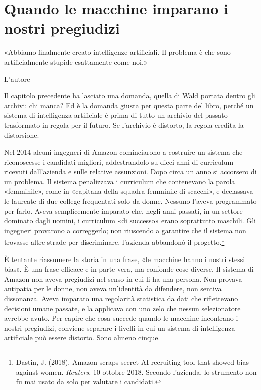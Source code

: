 \chapter{Quando le macchine imparano i nostri pregiudizi}
\label{cap:p3c11}

\epigraph{«Abbiamo finalmente creato intelligenze artificiali. Il problema è che sono artificialmente stupide esattamente come noi.»}{L'autore}

Il capitolo precedente ha lasciato una domanda, quella di Wald portata dentro gli archivi: chi manca? Ed è la domanda giusta per questa parte del libro, perché un sistema di intelligenza artificiale è prima di tutto un archivio del passato trasformato in regola per il futuro. Se l'archivio è distorto, la regola eredita la distorsione.

Nel 2014 alcuni ingegneri di Amazon cominciarono a costruire un sistema che riconoscesse i candidati migliori, addestrandolo su dieci anni di curriculum ricevuti dall'azienda e sulle relative assunzioni. Dopo circa un anno si accorsero di un problema. Il sistema penalizzava i curriculum che contenevano la parola «femminile», come in «capitana della squadra femminile di scacchi», e declassava le laureate di due college frequentati solo da donne. Nessuno l'aveva programmato per farlo. Aveva semplicemente imparato che, negli anni passati, in un settore dominato dagli uomini, i curriculum «di successo» erano soprattutto maschili. Gli ingegneri provarono a correggerlo; non riuscendo a garantire che il sistema non trovasse altre strade per discriminare, l'azienda abbandonò il progetto.\footnote{Dastin, J. (2018). Amazon scraps secret AI recruiting tool that showed bias against women. \textit{Reuters}, 10 ottobre 2018. Secondo l'azienda, lo strumento non fu mai usato da solo per valutare i candidati.}

È tentante riassumere la storia in una frase, «le macchine hanno i nostri stessi bias». È una frase efficace e in parte vera, ma confonde cose diverse. Il sistema di Amazon non aveva pregiudizi nel senso in cui li ha una persona. Non provava antipatia per le donne, non aveva un'identità da difendere, non sentiva dissonanza. Aveva imparato una regolarità statistica da dati che riflettevano decisioni umane passate, e la applicava con uno zelo che nessun selezionatore avrebbe avuto. Per capire che cosa succede quando le macchine incontrano i nostri pregiudizi, conviene separare i livelli in cui un sistema di intelligenza artificiale può essere distorto. Sono almeno cinque.

